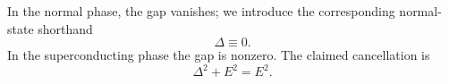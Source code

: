 \documentclass{article}
\begin{document}
In the normal phase, the gap vanishes; we introduce the corresponding
normal-state shorthand
\begin{equation}
\Delta \equiv 0 .
\label{eq:normal-gap}
\end{equation}
In the superconducting phase the gap is nonzero.  The claimed cancellation
is
\begin{equation}
\Delta^2 + E^2 = E^2 .
\label{eq:superconducting-cancellation}
\end{equation}
\end{document}
